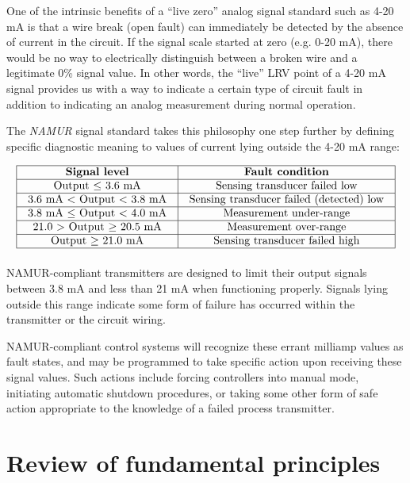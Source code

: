 One of the intrinsic benefits of a ``live zero'' analog signal standard such as 4-20 mA is that a wire break (open fault) can immediately be detected by the absence of current in the circuit.  If the signal scale started at zero (e.g. 0-20 mA), there would be no way to electrically distinguish between a broken wire and a legitimate 0\% signal value.  In other words, the ``live'' LRV point of a 4-20 mA signal provides us with a way to indicate a certain type of circuit fault in addition to indicating an analog measurement during normal operation.

The \textit{NAMUR} signal standard takes this philosophy one step further by defining specific diagnostic meaning to values of current lying outside the 4-20 mA range:  \label{NAMUR_signal_levels}


$$\vbox{\offinterlineskip
\halign{\strut
\vrule \quad\hfil # \ \hfil & 
\vrule \quad\hfil # \ \hfil \vrule \cr
\noalign{\hrule}
%
\textbf{Signal level} & \textbf{Fault condition} \cr
%
\noalign{\hrule}
%
Output $\leq$ 3.6 mA & Sensing transducer failed low \cr
%
\noalign{\hrule}
%
3.6 mA $<$ Output $<$ 3.8 mA & Sensing transducer failed (detected) low \cr
%
\noalign{\hrule}
%
3.8 mA $\leq$ Output $<$ 4.0 mA & Measurement under-range \cr
%
\noalign{\hrule}
%
21.0 $>$ Output $\geq$ 20.5 mA & Measurement over-range \cr
%
\noalign{\hrule}
%
Output $\geq$ 21.0 mA & Sensing transducer failed high \cr
%
\noalign{\hrule}
} %
}$$ %

NAMUR-compliant transmitters are designed to limit their output signals between 3.8 mA and less than 21 mA when functioning properly.  Signals lying outside this range indicate some form of failure has occurred within the transmitter or the circuit wiring.

NAMUR-compliant control systems will recognize these errant milliamp values as fault states, and may be programmed to take specific action upon receiving these signal values.  Such actions include forcing controllers into manual mode, initiating automatic shutdown procedures, or taking some other form of safe action appropriate to the knowledge of a failed process transmitter.








\filbreak
\section{Review of fundamental principles}

